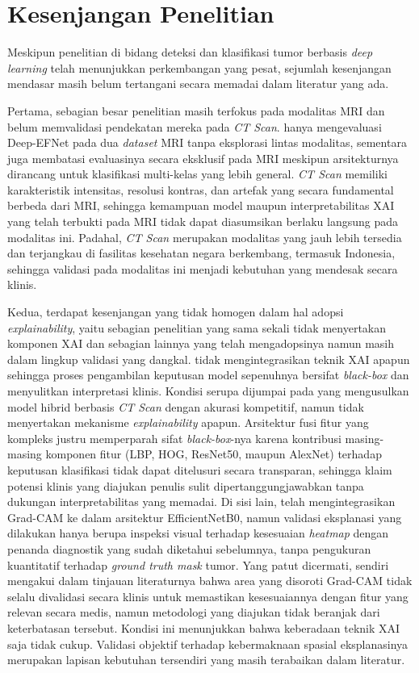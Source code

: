 \section{Kesenjangan Penelitian}
Meskipun penelitian di bidang deteksi dan klasifikasi tumor berbasis \textit{deep learning} telah menunjukkan perkembangan yang pesat, sejumlah kesenjangan mendasar masih belum tertangani secara memadai dalam literatur yang ada.

Pertama, sebagian besar penelitian masih terfokus pada modalitas MRI dan belum memvalidasi pendekatan mereka pada \textit{CT Scan}. \textcite{alshaari2025deepefnet} hanya mengevaluasi Deep-EFNet pada dua \textit{dataset} MRI tanpa eksplorasi lintas modalitas, sementara \textcite{Iftikhar2025ExplainableCNN} juga membatasi evaluasinya secara eksklusif pada MRI meskipun arsitekturnya dirancang untuk klasifikasi multi-kelas yang lebih general. \textit{CT Scan} memiliki karakteristik intensitas, resolusi kontras, dan artefak yang secara fundamental berbeda dari MRI, sehingga kemampuan model maupun interpretabilitas XAI yang telah terbukti pada MRI tidak dapat diasumsikan berlaku langsung pada modalitas ini. Padahal, \textit{CT Scan} merupakan modalitas yang jauh lebih tersedia dan terjangkau di fasilitas kesehatan negara berkembang, termasuk Indonesia, sehingga validasi pada modalitas ini menjadi kebutuhan yang mendesak secara klinis.

Kedua, terdapat kesenjangan yang tidak homogen dalam hal adopsi \textit{explainability}, yaitu sebagian penelitian yang sama sekali tidak menyertakan komponen XAI dan sebagian lainnya yang telah mengadopsinya namun masih dalam lingkup validasi yang dangkal. \textcite{alshaari2025deepefnet} tidak mengintegrasikan teknik XAI apapun sehingga proses pengambilan keputusan model sepenuhnya bersifat \textit{black-box} dan menyulitkan interpretasi klinis. Kondisi serupa dijumpai pada \textcite{ghasemi2025detection} yang mengusulkan model hibrid berbasis \textit{CT Scan} dengan akurasi kompetitif, namun tidak menyertakan mekanisme \textit{explainability} apapun. Arsitektur fusi fitur yang kompleks justru memperparah sifat \textit{black-box}-nya karena kontribusi masing-masing komponen fitur (LBP, HOG, ResNet50, maupun AlexNet) terhadap keputusan klasifikasi tidak dapat ditelusuri secara transparan, sehingga klaim potensi klinis yang diajukan penulis sulit dipertanggungjawabkan tanpa dukungan interpretabilitas yang memadai. Di sisi lain, \textcite{mahesh2024xai} telah mengintegrasikan Grad-CAM ke dalam arsitektur EfficientNetB0, namun validasi eksplanasi yang dilakukan hanya berupa inspeksi visual terhadap kesesuaian \textit{heatmap} dengan penanda diagnostik yang sudah diketahui sebelumnya, tanpa pengukuran kuantitatif terhadap \textit{ground truth mask} tumor. Yang patut dicermati, \textcite{mahesh2024xai} sendiri mengakui dalam tinjauan literaturnya bahwa area yang disoroti Grad-CAM tidak selalu divalidasi secara klinis untuk memastikan kesesuaiannya dengan fitur yang relevan secara medis, namun metodologi yang diajukan tidak beranjak dari keterbatasan tersebut. Kondisi ini menunjukkan bahwa keberadaan teknik XAI saja tidak cukup. Validasi objektif terhadap kebermaknaan spasial eksplanasinya merupakan lapisan kebutuhan tersendiri yang masih terabaikan dalam literatur.


